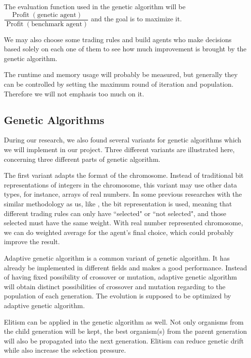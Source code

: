 \documentclass{article}
\begin{document}
The evaluation function used in the genetic algorithm will be
$\dfrac{
		\operatorname{Profit}(\text{genetic agent})
	}{
		\operatorname{Profit}(\text{benchmark agent})
	}$ and the goal is to maximize it.

We may also choose some trading rules and build agents who make decisions based solely
on each one of them to see how much improvement is brought by the genetic algorithm.

The runtime and memory usage will probably be measured,
but generally they can be controlled by setting the maximum round of iteration and population.
Therefore we will not emphasis too much on it.

\subsection{Genetic Algorithms}

During our research, we also found several variants for genetic algorithms which we will implement in our project.
Three different variants are illustrated here, concerning three different parts of genetic algorithm.

The first variant adapts the format of the chromosome.
Instead of traditional bit representations of integers in the chromosome,
this variant may use other data types, for instance, arrays of real numbers.
In some previous researches with the similar methodology as us,
like \cite{genetic-algorithms-for-predicting-the-egyptian-stock-market},
the bit representation is used, meaning that different trading rules can only have ``selected" or ``not selected",
and those selected must have the same weight.
With real number represented chromosome, we can do weighted average for the agent's final choice,
which could probably improve the result.

Adaptive genetic algorithm is a common variant of genetic algorithm.
It has already be implemented in different fields and makes a good performance.\cite{an-adaptive-genetic-algorithm-with-dominated-genes} \cite{an-adaptive-genetic-algorithm-for-crystal-structure-prediction}
Instead of having fixed possibility of crossover or mutation,
adaptive genetic algorithm will obtain distinct possibilities of crossover and mutation
regarding to the population of each generation.
The evolution is supposed to be optimized by adaptive genetic algorithm.

Elitism can be applied in the genetic algorithm as well.
Not only organisms from the child generation will be kept, the best organism(s) from the parent generation will also be propagated into the next generation.
Elitism can reduce genetic drift while also increase the selection pressure. \cite{eletism-based-compact-genetic-algorithms}
\end{document}

